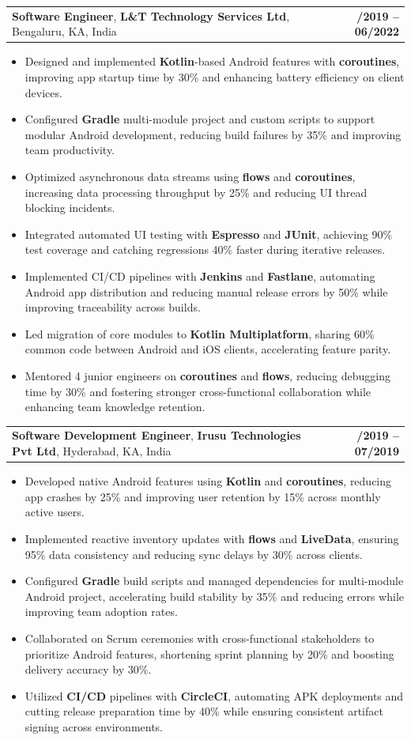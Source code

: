 \documentclass[letterpaper,11pt]{article}
\makeatletter
\newcommand{\resumeItem}[1]{
  \item\footnotesize{
    {#1 \vspace{-2pt}}
  }
}
\newcommand{\resumeSubheading}[4]{
  \vspace{-2pt}\item
    \begin{tabular*}{1.0\textwidth}[t]{l@{\extracolsep{\fill}}r}
      \textbf{\fontsize{10pt}{14pt}\selectfont #3}, \textbf{\fontsize{10pt}{14pt}\selectfont #1}, \fontsize{10pt}{14pt}\selectfont #4 & \textbf{\fontsize{10pt}{14pt}\selectfont #2} \\
    \end{tabular*}\vspace{-7pt}
}
\newcommand{\resumeItemListStart}{\begin{itemize}[leftmargin=*]}
\newcommand{\resumeItemListEnd}{\end{itemize}\vspace{-5pt}}
\makeatother
\begin{document}
    \resumeSubheading
        {L\&T Technology Services Ltd}{08/2019 -- 06/2022}
        {Software Engineer}{Bengaluru, KA, India}
      \resumeItemListStart
        \resumeItem{Designed and implemented \textbf{Kotlin}-based Android features with \textbf{coroutines}, improving app startup time by 30\% and enhancing battery efficiency on client devices.}
        \resumeItem{Configured \textbf{Gradle} multi-module project and custom scripts to support modular Android development, reducing build failures by 35\% and improving team productivity.}
        \resumeItem{Optimized asynchronous data streams using \textbf{flows} and \textbf{coroutines}, increasing data processing throughput by 25\% and reducing UI thread blocking incidents.}
        \resumeItem{Integrated automated UI testing with \textbf{Espresso} and \textbf{JUnit}, achieving 90\% test coverage and catching regressions 40\% faster during iterative releases.}
        \resumeItem{Implemented CI/CD pipelines with \textbf{Jenkins} and \textbf{Fastlane}, automating Android app distribution and reducing manual release errors by 50\% while improving traceability across builds.}
        \resumeItem{Led migration of core modules to \textbf{Kotlin Multiplatform}, sharing 60\% common code between Android and iOS clients, accelerating feature parity.}
        \resumeItem{Mentored 4 junior engineers on \textbf{coroutines} and \textbf{flows}, reducing debugging time by 30\% and fostering stronger cross-functional collaboration while enhancing team knowledge retention.}
      \resumeItemListEnd

    \resumeSubheading
        {Irusu Technologies Pvt Ltd}{01/2019 -- 07/2019}
        {Software Development Engineer}{Hyderabad, KA, India}
      \resumeItemListStart
        \resumeItem{Developed native Android features using \textbf{Kotlin} and \textbf{coroutines}, reducing app crashes by 25\% and improving user retention by 15\% across monthly active users.}
        \resumeItem{Implemented reactive inventory updates with \textbf{flows} and \textbf{LiveData}, ensuring 95\% data consistency and reducing sync delays by 30\% across clients.}
        \resumeItem{Configured \textbf{Gradle} build scripts and managed dependencies for multi-module Android project, accelerating build stability by 35\% and reducing errors while improving team adoption rates.}
        \resumeItem{Collaborated on Scrum ceremonies with cross-functional stakeholders to prioritize Android features, shortening sprint planning by 20\% and boosting delivery accuracy by 30\%.}
        \resumeItem{Utilized \textbf{CI/CD} pipelines with \textbf{CircleCI}, automating APK deployments and cutting release preparation time by 40\% while ensuring consistent artifact signing across environments.}
      \resumeItemListEnd
\end{document}
